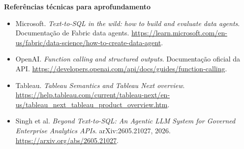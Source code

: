 \clearpage
\bigskip
\noindent\textbf{Referências técnicas para aprofundamento}

\begingroup\small
\begin{itemize}
\item Microsoft. \emph{Text-to-SQL in the wild: how to build and evaluate data agents}. Documentação de Fabric data agents. \url{https://learn.microsoft.com/en-us/fabric/data-science/how-to-create-data-agent}.
\item OpenAI. \emph{Function calling and structured outputs}. Documentação oficial da API. \url{https://developers.openai.com/api/docs/guides/function-calling}.
\item Tableau. \emph{Tableau Semantics and Tableau Next overview}. \url{https://help.tableau.com/current/tableau-next/en-us/tableau_next_tableau_product_overview.htm}.
\item Singh et al. \emph{Beyond Text-to-SQL: An Agentic LLM System for Governed Enterprise Analytics APIs}. arXiv:2605.21027, 2026. \url{https://arxiv.org/abs/2605.21027}.
\end{itemize}
\endgroup
